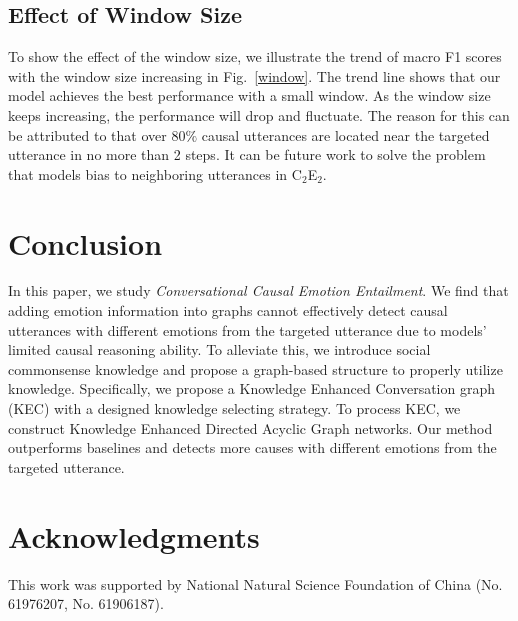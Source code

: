 \documentclass{article}
\begin{document}
\subsection{Effect of Window Size}

To show the effect of the window size, we illustrate the trend of macro F1 scores with the window size increasing in Fig.~\ref{window}. The trend line shows that our model achieves the best performance with a small window. As the window size keeps increasing, the performance will drop and fluctuate. The reason for this can be attributed to that over 80$\%$ causal utterances are located near the targeted utterance in no more than 2 steps. It can be future work to solve the problem that models bias to neighboring utterances in C$_2$E$_2$. 

\section{Conclusion}

In this paper, we study \textit{Conversational Causal Emotion Entailment}. We find that adding emotion information into graphs cannot effectively detect causal utterances with different emotions from the targeted utterance due to models' limited causal reasoning ability. To alleviate this, we introduce social commonsense knowledge and propose a graph-based structure to properly utilize knowledge. Specifically, we propose a Knowledge Enhanced Conversation graph (KEC) with a designed knowledge selecting strategy. To process KEC, we construct Knowledge Enhanced Directed Acyclic Graph networks. Our method outperforms baselines and detects more causes with different emotions from the targeted utterance.  

\section*{Acknowledgments}

This work was supported by National Natural Science Foundation of China (No. 61976207, No. 61906187). 



















\end{document}
